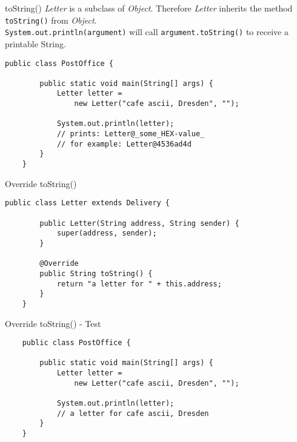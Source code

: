 \begin{frame}[fragile]{toString()}
	\emph{Letter} is a subclass of \emph{Object}.
	Therefore \emph{Letter} inherits the method \texttt{toString()} from \emph{Object}.\\
	\texttt{System.out.println(argument)} will call \texttt{argument.toString()} to receive
	a printable String.
	\begin{lstlisting}[escapechar=!]
	public class PostOffice {
	    
	    public static void main(String[] args) {	    
	        Letter letter = 
	            new Letter("cafe ascii, Dresden", "");
	        
	        System.out.println(letter);
	        // prints: Letter@_some_HEX-value_
	        // for example: Letter@4536ad4d
	    }
	}
	\end{lstlisting}
\end{frame}

\begin{frame}[fragile]{Override toString()}
	\begin{lstlisting}[escapechar=!]
	public class Letter extends Delivery {

	    public Letter(String address, String sender) {
	        super(address, sender);
	    }
	
	    @Override
	    public String toString() {
	        return "a letter for " + this.address;
	    }	
	}
	\end{lstlisting}
\end{frame}

\begin{frame}[fragile]{Override toString() - Test}
	\begin{lstlisting}
	public class PostOffice {
	    
	    public static void main(String[] args) {	    
	        Letter letter = 
	            new Letter("cafe ascii, Dresden", "");
	        
	        System.out.println(letter);
	        // a letter for cafe ascii, Dresden
	    }
	}
	\end{lstlisting}
\end{frame}


